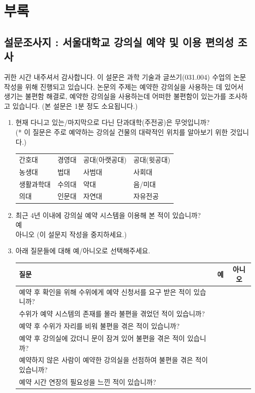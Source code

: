 \documentclass[11pt,a4paper]{article}
\begin{document}
\pagebreak
\section{부록}
\subsection{설문조사지 : 서울대학교 강의실 예약 및 이용 편의성 조사}
귀한 시간 내주셔서 감사합니다. 이 설문은 과학 기술과 글쓰기(031.004) 수업의 논문 작성을 위해 진행되고 있습니다. 논문의 주제는 예약한 강의실을 사용하는 데 있어서 생기는 불편함 해결로, 예약한 강의실을 사용하는데 어떠한 불편함이 있는가를 조사하고 있습니다. (본 설문은 1분 정도 소요됩니다.)
\begin{enumerate}
\item 현재 다니고 있는/마지막으로 다닌 단과대학(주전공)은 무엇입니까?\\
(* 이 질문은 주로 예약하는 강의실 건물의 대략적인 위치를 알아보기 위한 것입니다.)\\
\begin{tabular}{ l l l l }
간호대 & 경영대 & 공대(아랫공대) & 공대(윗공대)\\
농생대 & 법대 & 사범대 & 사회대\\
생활과학대 & 수의대 & 약대 & 음/미대\\
의대 & 인문대 & 자연대 & 자유전공
\end{tabular}
\item 최근 4년 이내에 강의실 예약 시스템을 이용해 본 적이 있습니까?\\
예\\
아니오 (이 설문지 작성을 중지하세요.)
\item 아래 질문들에 대해 예/아니오로 선택해주세요.\\
\begin{tabular}{ | l | c | c | }
\hline
질문 & 예 & 아니오 \\
\hline
예약 후 확인을 위해 수위에게 예약 신청서를 요구 받은 적이 있습니까? & & \\
\hline
수위가 예약 시스템의 존재를 몰라 불편을 겪었던 적이 있습니까? & & \\
\hline
예약 후 수위가 자리를 비워 불편을 겪은 적이 있습니까? & & \\
\hline
예약 후 강의실에 갔더니 문이 잠겨 있어 불편을 겪은 적이 있습니까? & & \\
\hline
예약하지 않은 사람이 예약한 강의실을 선점하여 불편을 겪은 적이 있습니까? & & \\
\hline
예약 시간 연장의 필요성을 느낀 적이 있습니까? & & \\

\end{tabular}
\end{enumerate}
\end{document}
